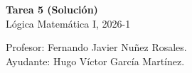 \documentclass[letterpaper,DIV=15,headsepline,12pt]{scrartcl}
\begin{document}
    \thispagestyle{beginstyle}
    \begin{center}
        {\fontsize{30}{60}\rmfamily \textbf{Tarea 5 (Solución)}} \\ \vspace{.2cm}
        Lógica Matemática I, 2026-1
    \end{center}
    \begin{flushright}
        \footnotesize \hfill Profesor: Fernando Javier Nuñez Rosales.\\
        \hfill Ayudante: Hugo Víctor García Martínez.
    \end{flushright}
\end{document}

